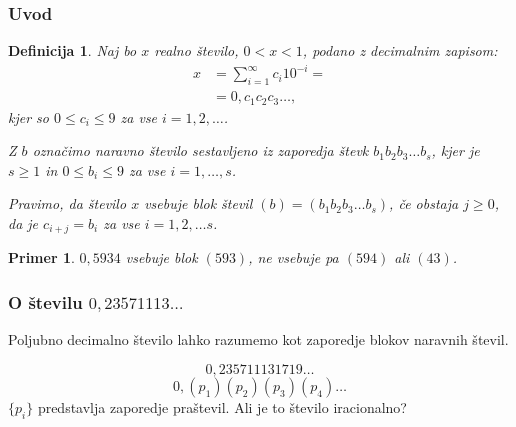 \documentclass{beamer}
\newtheorem{definicija}{Definicija}
\newtheorem{primer}{Primer}
\begin{document}
\begin{frame}
    \frametitle{Uvod}
    \begin{definicija}
        Naj bo $x$ realno število, $ 0 < x < 1$, podano z decimalnim zapisom: 
        \[ 
            \begin{split}
                x & = \sum^{\infty}_{i=1} c_i 10^{-i} = \\
                & = 0,c_1c_2c_3 \ldots ,
            \end{split}   
        \]
        kjer so $0 \leq c_i \leq 9$ za vse $ i = 1, 2, \ldots$.
        
        Z $b$ označimo naravno število sestavljeno iz zaporedja števk
        $b_1b_2b_3 \ldots b_s$, 
        kjer je $s\geq 1$ in $0 \leq b_i \leq 9$ za vse $i = 1, \ldots, s$.

        Pravimo, da število $x$ \alert{vsebuje blok števil} $(b) = (b_1b_2b_3 \dots b_s)$, če obstaja $j \geq 0$, da je 
        $c_{i+j} = b_i$ za vse $i=1, 2, \ldots s$. 
    \end{definicija}


    \pause
    \begin{primer}
        $0,5934$ vsebuje blok $(593)$, ne vsebuje pa $(594)$ ali $(43)$.
    \end{primer} 


\end{frame}

\begin{frame}
    \frametitle{O številu $0,23571113\ldots$}
    Poljubno decimalno število lahko razumemo kot zaporedje blokov naravnih števil.

    \pause
    \[0,235711131719\ldots\]
    \pause
    \[0,(p_1)(p_2)(p_3)(p_4)\ldots\]
    $\{p_i\}$ predstavlja zaporedje praštevil.
    \pause
    \newline
    \newline
    Ali je to število iracionalno?


\end{frame}
\end{document}
